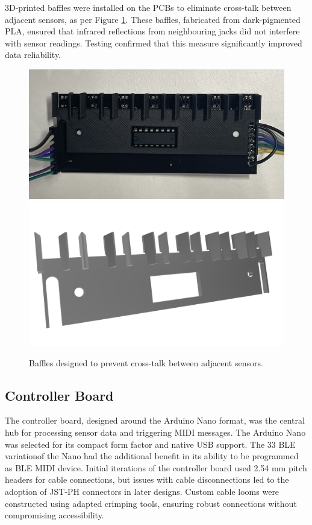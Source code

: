 3D-printed baffles were installed on the PCBs to eliminate cross-talk between adjacent sensors, as per Figure \ref{fig:baffles}. These baffles, fabricated from dark-pigmented PLA, ensured that infrared reflections from neighbouring jacks did not interfere with sensor readings. Testing confirmed that this measure significantly improved data reliability.


\begin{figure}
    \centering
    \includegraphics[width=\linewidth]{src/images/sensor-board-w-baffles.jpeg}
    \\
    \includegraphics[width=\linewidth]{src/images/baffles.png}
    \caption{Baffles designed to prevent cross-talk between adjacent sensors.}
    \Description{}
    \label{fig:baffles}
\end{figure}
\subsection{Controller Board}\label{controller-board}

The controller board, designed around the Arduino Nano format, was the central hub for processing sensor data and triggering MIDI messages. The Arduino Nano was selected for its compact form factor and native USB support. The 33 BLE variationof the Nano had the additional benefit in its ability to be programmed as BLE MIDI device.  Initial iterations of the controller board used 2.54 mm pitch headers for cable connections, but issues with cable disconnections led to the adoption of JST-PH connectors in later designs. Custom cable looms were constructed using adapted crimping tools, ensuring robust connections without compromising accessibility.


